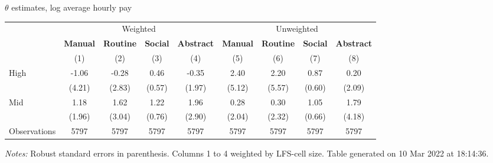 \begin{center}
\begin{threeparttable}[!h]
\caption{$ \theta $ estimates, log average hourly pay}
\begin{tabular}{lcccccccc}
\toprule
\toprule
& \multicolumn{4}{c}{Weighted} & \multicolumn{4}{c}{Unweighted} \\
&\multicolumn{1}{c}{\textbf{Manual}}&\multicolumn{1}{c}{\textbf{Routine}}&\multicolumn{1}{c}{\textbf{Social}}&\multicolumn{1}{c}{\textbf{Abstract}}&\multicolumn{1}{c}{\textbf{Manual}}&\multicolumn{1}{c}{\textbf{Routine}}&\multicolumn{1}{c}{\textbf{Social}}&\multicolumn{1}{c}{\textbf{Abstract}} \\
\textbf{}&\multicolumn{1}{c}{(1)}&\multicolumn{1}{c}{(2)}&\multicolumn{1}{c}{(3)}&\multicolumn{1}{c}{(4)}&\multicolumn{1}{c}{(5)}&\multicolumn{1}{c}{(6)}&\multicolumn{1}{c}{(7)}&\multicolumn{1}{c}{(8)} \\
\midrule
High                &       -1.06&       -0.28&        0.46&       -0.35&        2.40&        2.20&        0.87&        0.20\\
                    &      (4.21)&      (2.83)&      (0.57)&      (1.97)&      (5.12)&      (5.57)&      (0.60)&      (2.09)\\
Mid                 &        1.18&        1.62&        1.22&        1.96&        0.28&        0.30&        1.05&        1.79\\
                    &      (1.96)&      (3.04)&      (0.76)&      (2.90)&      (2.04)&      (2.32)&      (0.66)&      (4.18)\\
Observations        &        5797&        5797&        5797&        5797&        5797&        5797&        5797&        5797\\
\bottomrule
\bottomrule
\end{tabular}
\begin{tablenotes}
\item \footnotesize \textit{Notes:} Robust standard errors in parenthesis. Columns 1 to 4 weighted by LFS-cell size. Table generated on 10 Mar 2022 at 18:14:36.
\end{tablenotes}
\end{threeparttable}
\end{center}

